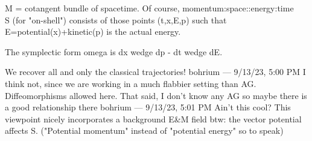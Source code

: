\documentclass{book}
\begin{document}
M = cotangent bundle of spacetime.  Of course, momentum:space::energy:time\\

S (for "on-shell") consists of those points (t,x,E,p) such that E=potential(x)+kinetic(p) is the actual energy.

The symplectic form omega is dx wedge dp - dt wedge dE.

We recover all and only the classical trajectories!
bohrium — 9/13/23, 5:00 PM
I think not, since we are working in a much flabbier setting than AG.  Diffeomorphisms allowed here.
That said, I don't know any AG so maybe there is a good relationship there
bohrium — 9/13/23, 5:01 PM
Ain't this cool?
This viewpoint nicely incorporates a background E&M field btw: the vector potential affects S.
("Potential momentum" instead of "potential energy" so to speak)
\fi
\end{document}
